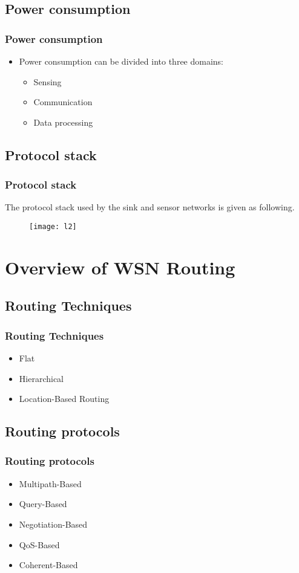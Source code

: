 \documentclass[xcolor=dvipsnames]{beamer}
\begin{document}
\subsection{Power consumption}
\begin{frame}
\frametitle{Power consumption}
\begin{itemize}
\item Power consumption can be divided into three domains:
\begin{itemize}
\item Sensing
\item Communication
\item Data processing
\end{itemize}
\end{itemize}
\end{frame}

\subsection{Protocol stack}
\begin{frame}
\frametitle{Protocol stack}
The protocol stack used by the sink and sensor networks is given as following.
\begin{figure}
\begin{center}
  \texttt{[image: l2]}
\end{center}
\end{figure}
\end{frame}



\section{Overview of WSN Routing}
\subsection{Routing Techniques}
\begin{frame}
	\frametitle{Routing Techniques}
	\begin{itemize}
	\item<1-> Flat
	\item<2-> Hierarchical
	\item<3-> Location-Based Routing
	\end{itemize}
\end{frame}

\subsection{Routing protocols}
\begin{frame}
	\frametitle{Routing protocols}
	\begin{itemize}
	\item Multipath-Based
	\item Query-Based
	\item Negotiation-Based
	\item QoS-Based
	\item Coherent-Based
	\end{itemize}
\end{frame}
\end{document}

